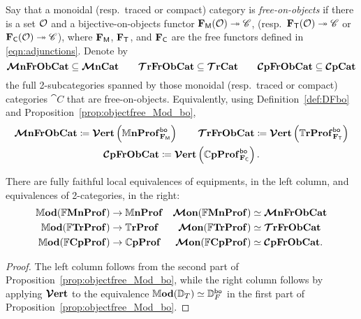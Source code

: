 \documentclass[11pt,oneside,article]{memoir}
\begin{document}
\begin{definition}
      \label{def:free_on_objects}
   Say that a monoidal (resp.\ traced or compact) category is \emph{free-on-objects} if there is a
   set $\LabSet$ and a bijective-on-objects functor $\FM(\LabSet)\onto\cat{C}$, (resp.\
   $\FT(\LabSet)\onto\cat{C}$ or $\FC(\LabSet)\onto\cat{C}$), where $\FM$, $\FT$, and $\FC$ are the
   free functors defined in \eqref{eqn:adjunctions}. Denote by
   \[
      \MMonFrObCat\ss\MMonCat\qquad \TTrFrObCat\ss\TTrCat\qquad\CCompFrObCat\ss\CCompCat
   \]
   the full 2-subcategories spanned by those monoidal (resp.\ traced or compact) categories $\cat{C}$
   that are free-on-objects. Equivalently, using Definition~\ref{def:DFbo} and
   Proposition~\ref{prop:objectfree_Mod_bo},
   \begin{gather*}
      \MMonFrObCat \coloneqq \VVer\left(\dMonProf_{\FM}^{\bo}\right) \qquad
      \TTrFrObCat \coloneqq \VVer\left(\dTrProf_{\FT}^{\bo}\right) \\
      \CCompFrObCat \coloneqq \VVer\left(\dCompProf_{\FC}^{\bo}\right).
   \end{gather*}
\end{definition}

\begin{corollary}
      \label{cor:TrCat_ObjectFree}
   There are fully faithful local equivalences of equipments, in the left column, and equivalences
   of 2-categories, in the right:
   \begin{align*}
      \dMod(\dFrMonProf)  &\to \dMonProf &\MMon(\dFrMonProf)&\equiv\MMonFrObCat\\
      \dMod(\dFrTrProf)   &\to \dTrProf  &\MMon(\dFrTrProf)&\equiv\TTrFrObCat\\
      \dMod(\dFrCompProf) &\to \dCompProf &\MMon(\dFrCompProf)&\equiv\CCompFrObCat.
   \end{align*}
\end{corollary}
\begin{proof}
   The left column follows from the second part of Proposition~\ref{prop:objectfree_Mod_bo}, while
   the right column follows by applying $\VVer$ to the equivalence
   $\dMod(\dcat{D}_T)\equiv\dcat{D}^{\bo}_F$ in the first part of
   Proposition~\ref{prop:objectfree_Mod_bo}.
\end{proof}
\end{document}
